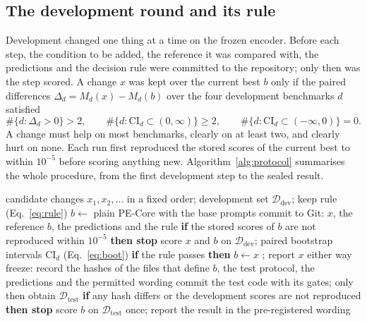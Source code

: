 \documentclass[a4paper,fleqn]{cas-sc}
\begin{document}
\subsection{The development round and its rule}
\label{sec:rule}
Development changed one thing at a time on the frozen encoder. Before each step, the
condition to be added, the reference it was compared with, the predictions and the
decision rule were committed to the repository; only then was the step scored. A
change $x$ was kept over the current best $b$ only if the paired differences
$\Delta_d = M_d(x)-M_d(b)$ over the four development benchmarks $d$ satisfied
\begin{equation}
\#\{d:\Delta_d>0\} > 2, \qquad
\#\{d:\mathrm{CI}_d \subset (0,\infty)\} \ge 2, \qquad
\#\{d:\mathrm{CI}_d \subset (-\infty,0)\} = 0 .
\label{eq:rule}
\end{equation}
A change must help on most benchmarks, clearly on at least two, and clearly hurt on
none. Each run first reproduced the stored scores of the current best to within
$10^{-5}$ before scoring anything new. Algorithm~\ref{alg:protocol} summarises the whole
procedure, from the first development step to the sealed result.

\begin{algorithm}[t]
\caption{Development under committed rules, then one sealed test}\label{alg:protocol}
\begin{algorithmic}[1]
\Require candidate changes $x_1, x_2, \dots$ in a fixed order; development set $\mathcal{D}_{\mathrm{dev}}$; keep rule (Eq.~\ref{eq:rule})
\State $b \gets$ plain PE-Core with the base prompts
  \State commit to Git: $x$, the reference $b$, the predictions and the rule 
  \State \textbf{if} the stored scores of $b$ are not reproduced within $10^{-5}$ \textbf{then stop}
  \State score $x$ and $b$ on $\mathcal{D}_{\mathrm{dev}}$; paired bootstrap intervals $\mathrm{CI}_d$ (Eq.~\ref{eq:boot})
  \State \textbf{if} the rule passes \textbf{then} $b \gets x$ ; report $x$ either way
\EndFor
\State freeze: record the hashes of the files that define $b$, the test protocol, the predictions and the permitted wording
\State commit the test code with its gates; only then obtain $\mathcal{D}_{\mathrm{test}}$
\State \textbf{if} any hash differs or the development scores are not reproduced \textbf{then stop}
\State score $b$ on $\mathcal{D}_{\mathrm{test}}$ once; report the result in the pre-registered wording
\end{algorithmic}
\end{algorithm}
\end{document}
